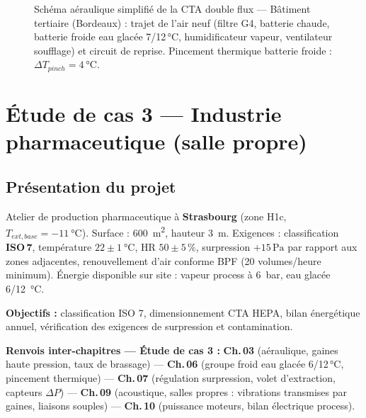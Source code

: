 \begin{figure}[H]
  \caption{Schéma aéraulique simplifié de la CTA double flux — Bâtiment tertiaire (Bordeaux) :
    trajet de l'air neuf (filtre G4, batterie chaude, batterie froide eau glacée 7/12\,°C,
    humidificateur vapeur, ventilateur soufflage) et circuit de reprise.
    Pincement thermique batterie froide : $\Delta T_{pinch} = \SI{4}{\celsius}$.}
\end{figure}

\section{Étude de cas 3 — Industrie pharmaceutique (salle propre)}

\subsection{Présentation du projet}

Atelier de production pharmaceutique à \textbf{Strasbourg} (zone H1c, $T_{ext,base} = \SI{-11}{\celsius}$).
Surface : \SI{600}{\metre\squared}, hauteur \SI{3}{\metre}.
Exigences : classification \textbf{ISO\,7}, température $22 \pm \SI{1}{\celsius}$,
HR $50 \pm 5\,\%$, surpression $+15\,\si{\pascal}$ par rapport aux zones adjacentes,
renouvellement d'air conforme BPF (20 volumes/heure minimum).
Énergie disponible sur site : vapeur process à \SI{6}{\bar}, eau glacée \SI[parse-numbers=false]{6/12}{\celsius}.

\textbf{Objectifs :} classification ISO 7, dimensionnement CTA HEPA, bilan énergétique annuel,
vérification des exigences de surpression et contamination.

\begin{tcolorbox}[colback=FedBlue!4, colframe=FedBlue!35, boxrule=0.5pt, arc=1pt,
  top=3pt, bottom=3pt, left=6pt, right=6pt]
\footnotesize\sffamily
\textbf{Renvois inter-chapitres — Étude de cas 3 :}\quad
\textbf{Ch.\,03} (aéraulique, gaines haute pression, taux de brassage) — \textbf{Ch.\,06} (groupe froid eau glacée 6/12\,°C, pincement thermique) —
\textbf{Ch.\,07} (régulation surpression, volet d'extraction, capteurs $\Delta P$) —
\textbf{Ch.\,09} (acoustique, salles propres : vibrations transmises par gaines, liaisons souples) —
\textbf{Ch.\,10} (puissance moteurs, bilan électrique process).
\end{tcolorbox}

